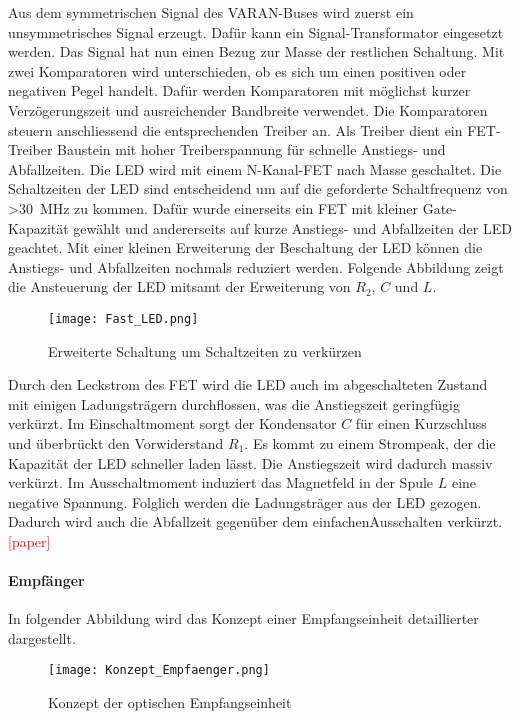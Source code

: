 Aus dem symmetrischen Signal des VARAN-Buses wird zuerst ein unsymmetrisches Signal erzeugt. Dafür kann ein Signal-Transformator eingesetzt werden. Das Signal hat nun einen Bezug zur Masse der restlichen Schaltung. Mit zwei Komparatoren wird unterschieden, ob es sich um einen positiven oder negativen Pegel handelt. Dafür werden Komparatoren mit möglichst kurzer Verzögerungszeit und ausreichender Bandbreite verwendet. Die Komparatoren steuern anschliessend die entsprechenden Treiber an. Als Treiber dient ein FET-Treiber Baustein mit hoher Treiberspannung für schnelle Anstiegs- und Abfallzeiten. Die LED wird mit einem N-Kanal-FET nach Masse geschaltet. Die Schaltzeiten der LED sind entscheidend um auf die geforderte Schaltfrequenz von \textgreater \SI{30}{MHz} zu kommen. Dafür wurde einerseits ein FET mit kleiner Gate-Kapazität gewählt und andererseits auf kurze Anstiegs- und Abfallzeiten der LED geachtet.
\newline
Mit einer kleinen Erweiterung der Beschaltung der LED können die Anstiegs- und Abfallzeiten nochmals reduziert werden. Folgende Abbildung zeigt die Ansteuerung der LED mitsamt der Erweiterung von $R_{2}$, $C$ und $L$.

 \begin{figure}[h]
 	\centering
 	\texttt{[image: Fast\_LED.png]}
 	\caption{Erweiterte Schaltung um Schaltzeiten zu verkürzen}\label{fig:Fast_LED}
 \end{figure}

Durch den Leckstrom des FET wird die LED auch im abgeschalteten Zustand mit einigen Ladungsträgern durchflossen, was die Anstiegszeit geringfügig verkürzt. Im Einschaltmoment sorgt der Kondensator $C$ für einen Kurzschluss und überbrückt den Vorwiderstand $R_{1}$. Es kommt zu einem Strompeak, der die Kapazität der LED schneller laden lässt. Die Anstiegszeit wird dadurch massiv verkürzt. Im Ausschaltmoment induziert das Magnetfeld in der Spule $L$ eine negative Spannung. Folglich werden die Ladungsträger aus der LED gezogen. Dadurch wird auch die Abfallzeit gegenüber dem \glqq einfachen\grqq Ausschalten verkürzt.\textcolor{red}{[paper]}

\paragraph{Empfänger}
In folgender Abbildung wird das Konzept einer Empfangseinheit detaillierter dargestellt.

\begin{figure}[h]
	\centering
	\texttt{[image: Konzept\_Empfaenger.png]}
	\caption{Konzept der optischen Empfangseinheit}\label{fig:Konzept_Empfaenger}
\end{figure}

